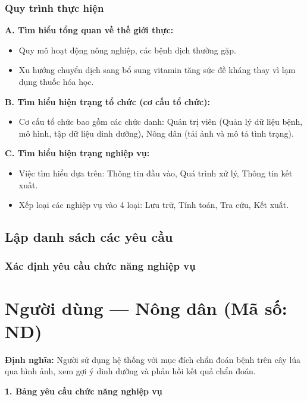 \documentclass[12pt,a4paper]{article}
\begin{document}
\subsubsection{Quy trình thực hiện}
\textbf{A. Tìm hiểu tổng quan về thế giới thực:}
\begin{itemize}
    \item Quy mô hoạt động nông nghiệp, các bệnh dịch thường gặp.
    \item Xu hướng chuyển dịch sang bổ sung vitamin tăng sức đề kháng thay vì lạm dụng thuốc hóa học.
\end{itemize}

\textbf{B. Tìm hiểu hiện trạng tổ chức (cơ cấu tổ chức):}
\begin{itemize}
    \item Cơ cấu tổ chức bao gồm các chức danh: Quản trị viên (Quản lý dữ liệu bệnh, mô hình, tập dữ liệu dinh dưỡng), Nông dân (tải ảnh và mô tả tình trạng).
\end{itemize}

\textbf{C. Tìm hiểu hiện trạng nghiệp vụ:}
\begin{itemize}
    \item Việc tìm hiểu dựa trên: Thông tin đầu vào, Quá trình xử lý, Thông tin kết xuất.
    \item Xếp loại các nghiệp vụ vào 4 loại: Lưu trữ, Tính toán, Tra cứu, Kết xuất.
\end{itemize}

\hrulefill

\subsection{Lập danh sách các yêu cầu}
\subsubsection{Xác định yêu cầu chức năng nghiệp vụ}

\section{Người dùng --- Nông dân (Mã số: ND)}
 
\textbf{Định nghĩa:} Người sử dụng hệ thống với mục đích chẩn đoán bệnh trên cây lúa qua hình ảnh, xem gợi ý dinh dưỡng và phản hồi kết quả chẩn đoán.
 
\vspace{0.3cm}
\textbf{1. Bảng yêu cầu chức năng nghiệp vụ}
 
\end{document}
